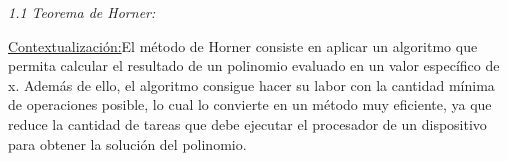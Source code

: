 \documentclass[12pt]{article}
\renewcommand{\_}{\kern-1.5pt\textunderscore\kern-1.5pt}
\begin{document}
\vspace{\baselineskip}
\setlength{\parskip}{8.04pt}
\setlength{\parskip}{0.0pt}
\begin{justify}
{\fontsize{10pt}{12.0pt}\selectfont \textit{1.1 Teorema de Horner: }\par}
\end{justify}\par


\vspace{\baselineskip}
\setlength{\parskip}{8.04pt}
\setlength{\parskip}{0.0pt}
\begin{adjustwidth}{0.5in}{0.0in}
\begin{justify}
{\fontsize{10pt}{12.0pt}\selectfont \uline{Contextualización:}El método de Horner consiste en aplicar un algoritmo que permita calcular el resultado de un polinomio evaluado en un valor específico de x. Además de ello, el algoritmo consigue hacer su labor con la cantidad mínima de operaciones posible, lo cual lo convierte en un método muy eficiente, ya que reduce la cantidad de tareas que debe ejecutar el procesador de un dispositivo para obtener la solución del polinomio.\uline{ }\par}
\end{justify}\par

\end{adjustwidth}
\end{document}
